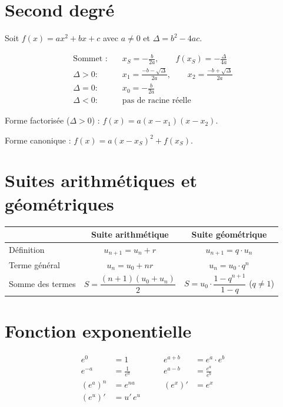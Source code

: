 \section*{Second degré}

Soit $f(x) = ax^2 + bx + c$ avec $a \neq 0$ et $\Delta = b^2 - 4ac$.

\begin{align*}
\text{Sommet :} \quad & x_S = -\frac{b}{2a}, \qquad
  f(x_S) = -\frac{\Delta}{4a} \\[6pt]
\Delta > 0 : \quad & x_1 = \frac{-b - \sqrt{\Delta}}{2a}, \qquad
  x_2 = \frac{-b + \sqrt{\Delta}}{2a} \\[4pt]
\Delta = 0 : \quad & x_0 = -\frac{b}{2a} \\[4pt]
\Delta < 0 : \quad & \text{pas de racine réelle}
\end{align*}

Forme factorisée ($\Delta > 0$) : $f(x) = a(x - x_1)(x - x_2)$.

Forme canonique : $f(x) = a\!\left(x - x_S\right)^2 + f(x_S)$.

\section*{Suites arithmétiques et géométriques}

\begin{center}
\renewcommand{\arraystretch}{1.5}
\begin{tabular}{lcc}
\toprule
 & \textbf{Suite arithmétique} & \textbf{Suite géométrique} \\
\midrule
Définition   & $u_{n+1} = u_n + r$         & $u_{n+1} = q \cdot u_n$ \\
Terme général & $u_n = u_0 + nr$            & $u_n = u_0 \cdot q^n$ \\
Somme des termes & $S = \dfrac{(n+1)(u_0 + u_n)}{2}$ &
  $S = u_0 \cdot \dfrac{1 - q^{n+1}}{1 - q}$ \; ($q \neq 1$) \\
\bottomrule
\end{tabular}
\end{center}

\section*{Fonction exponentielle}

\begin{align*}
e^0 &= 1 &\qquad e^{a+b} &= e^a \cdot e^b \\
e^{-a} &= \frac{1}{e^a} &\qquad e^{a-b} &= \frac{e^a}{e^b} \\
\left(e^a\right)^n &= e^{na} &\qquad (e^x)' &= e^x \\
(e^{u})' &= u' \, e^{u}
\end{align*}


